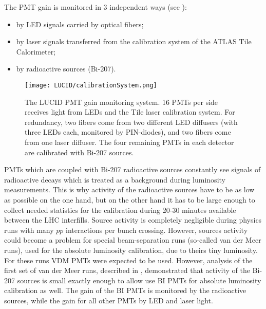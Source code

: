 The PMT gain is monitored in 3 independent ways (see ):
\begin{itemize}
 \item by LED signals carried by optical fibers;
 \item by laser signals transferred from the calibration system of the ATLAS Tile Calorimeter;
 \item by radioactive sources (Bi-207).
\end{itemize}

\begin{figure}
\centering
\texttt{[image: LUCID/calibrationSystem.png]}
\caption{The LUCID PMT gain monitoring system. 16 PMTs per side receives light from LEDs and the Tile laser calibration 
system. 
For redundancy, two fibers come from two different LED diffusers (with three LEDs each, monitored by 
PIN-diodes), and two fibers come from one laser diffuser. The four remaining PMTs in each detector are calibrated 
with Bi-207 sources.}
\label{fig:calibrationSystem}
\end{figure}


PMTs which are coupled with Bi-207 radioactive sources constantly see signals of radioactive decays which is treated as a background
during luminosity measurements. This is why activity of the radioactive sources have to be as low as possible on the one hand, 
but on the other hand it has to be large enough to collect needed statistics for the calibration during 20-30 minutes available between the LHC interfills.
Source activity is completely negligible during physics runs with many $pp$ interactions per bunch crossing. However, sources activity could become 
a problem for special beam-separation runs (so-called van der Meer runs), used for the absolute luminosity calibration, due to theirs tiny luminosity.
For these runs VDM PMTs were expected to be used. However, analysis of the first set of van der Meer runs, described in , 
demonstrated that activity of the Bi-207 sources is small exactly enough to allow use BI PMTs for absolute luminosity calibration as well. 
The gain of the BI PMTs is monitored by the radioactive sources, while the gain for all other PMTs by LED and laser light.

